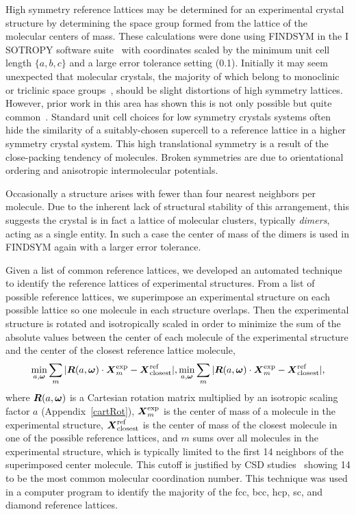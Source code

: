 \documentclass[preprint]{revtex4}              %
\newcommand{\mb}[1]{\ensuremath{\mbox{\boldmath $ #1 $}}}
\newcommand{\mbss}[1]{\ensuremath{\mbox{\boldmath $ \scriptstyle #1 $}}}
\begin{document}
High symmetry reference lattices may be determined for an
experimental crystal structure by determining the space group formed
from the lattice of the molecular centers of mass. These
calculations were done using F{\small INDSYM} in the I{\small
SOTROPY} software suite~\cite{Stokes02b} with coordinates scaled by
the minimum unit cell length $\{a,b,c\}$ and a large error tolerance
setting (0.1). Initially it may seem unexpected that molecular
crystals, the majority of which belong to monoclinic or triclinic
space groups~\cite{Bassoul00}, should be slight distortions of high
symmetry lattices. However, prior work in this area has shown this
is not only possible but quite
common~\cite{Motherwell97,Reichling00}. Standard unit cell choices
for low symmetry crystals systems often hide the similarity of a
suitably-chosen supercell to a reference lattice in a higher
symmetry crystal system. This high translational symmetry is a
result of the close-packing tendency of molecules. Broken symmetries
are due to orientational ordering and anisotropic intermolecular
potentials.

Occasionally a structure arises with fewer than four nearest
neighbors per molecule.  Due to the inherent lack of structural
stability of this arrangement, this suggests the crystal is in fact
a lattice of molecular clusters, typically \emph{dimers}, acting as
a single entity.  In such a case the center of mass of the dimers is
used in F{\small INDSYM} again with a larger error tolerance.

Given a list of common reference lattices, we developed an automated
technique to identify the reference lattices of experimental
structures. From a list of possible reference lattices, we
superimpose an experimental structure on each possible lattice so
one molecule in each structure overlaps. Then the experimental
structure is rotated and isotropically scaled in order to minimize
the sum of the absolute values between the center of each molecule
of the experimental structure and the center of the closest
reference lattice molecule,
\begin{equation}
\min_{a,\mbox{\boldmath $\scriptstyle \omega$}}\sum_m|\mb{R}(a,\mb{\omega})\cdot\mb{X}^{\mathrm{exp}}_m
 - \mb{X}^{\mathrm{ref}}_{\mathrm{closest}}|,
\min_{a,\mbss{\omega}}\sum_m|\mb{R}(a,\mb{\omega})\cdot\mb{X}^{\mathrm{exp}}_m
 - \mb{X}^{\mathrm{ref}}_{\mathrm{closest}}|,
\end{equation}
where $\mb{R}(a,\mb{\omega})$ is a Cartesian rotation matrix
multiplied by an isotropic scaling factor $a$
(Appendix~\ref{cartRot}), $\mb{X}^{\mathrm{exp}}_m$ is the center of
mass of a molecule in the experimental structure,
$\mb{X}^{\mathrm{ref}}_{\mathrm{closest}}$ is the center of mass of
the closest molecule in one of the possible reference lattices, and
$m$ sums over all molecules in the experimental structure, which is
typically limited to the first 14 neighbors of the superimposed
center molecule.  This cutoff is justified by CSD
studies~\cite{Peresypkina00} showing 14 to be the most common
molecular coordination number. This technique was used in a computer
program to identify the majority of the fcc, bcc, hcp, sc, and
diamond reference lattices.
\end{document}
